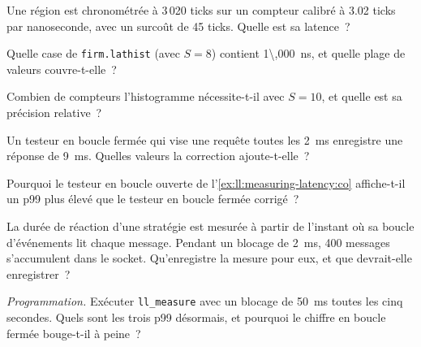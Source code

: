 \begin{exercise}[$\star$]\label{exo:ll:measuring-latency:1}
Une région est chronométrée à 3\,020 ticks sur un compteur calibré à 3.02 ticks par nanoseconde, avec un surcoût de 45 ticks. Quelle
est sa latence~?
\end{exercise}

\begin{exercise}[$\star$]\label{exo:ll:measuring-latency:2}
Quelle case de \texttt{firm.lathist} (avec $S = 8$) contient \qty{1\,000}{\nano\second}, et quelle plage de valeurs
couvre-t-elle~?
\end{exercise}

\begin{exercise}[$\star$]\label{exo:ll:measuring-latency:3}
Combien de compteurs l'histogramme nécessite-t-il avec $S = 10$, et quelle est sa précision relative~?
\end{exercise}

\begin{exercise}[$\star\star$]\label{exo:ll:measuring-latency:4}
Un testeur en boucle fermée qui vise une requête toutes les \qty{2}{\milli\second} enregistre une réponse de \qty{9}{\milli\second}. Quelles
valeurs la correction ajoute-t-elle~?
\end{exercise}

\begin{exercise}[$\star\star$]\label{exo:ll:measuring-latency:5}
Pourquoi le testeur en boucle ouverte de l'\cref{ex:ll:measuring-latency:co} affiche-t-il un p99 plus élevé que le
testeur en boucle fermée corrigé~?
\end{exercise}

\begin{exercise}[$\star\star$]\label{exo:ll:measuring-latency:6}
La durée de réaction d'une stratégie est mesurée à partir de l'instant où sa boucle d'événements lit chaque message. Pendant un
blocage de \qty{2}{\milli\second}, 400 messages s'accumulent dans le socket. Qu'enregistre la mesure pour eux, et que devrait-elle enregistrer~?
\end{exercise}

\begin{exercise}[$\star\star\star$]\label{exo:ll:measuring-latency:7}
\emph{Programmation.} Exécuter \texttt{ll\_measure} avec un blocage de \qty{50}{\milli\second} toutes les cinq secondes. Quels sont les trois p99
désormais, et pourquoi le chiffre en boucle fermée bouge-t-il à peine~?
\end{exercise}

